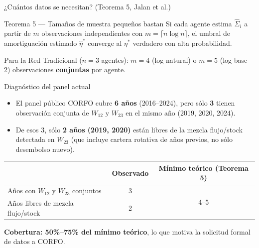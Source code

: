 \documentclass[aspectratio=169]{beamer}
\begin{document}
\begin{frame}{¿Cuántos datos se necesitan? (Teorema 5, Jalan et al.)}
\begin{block}{Teorema 5 --- Tamaños de muestra pequeños bastan}
Si cada agente estima $\hat\Sigma_i$ a partir de $m$ observaciones independientes con $m=\lceil n\log n\rceil$, el umbral de amortiguación estimado $\hat\eta^*$ converge al $\eta^*$ verdadero con alta probabilidad.
\end{block}

\vspace{0.3cm}
Para la Red Tradicional ($n=3$ agentes): $m=4$ (log natural) o $m=5$ (log base 2) observaciones \textbf{conjuntas} por agente.

\vspace{0.2cm}

\end{frame}

\begin{frame}{Diagnóstico del panel actual}
\begin{itemize}
    \item El panel público CORFO cubre \textbf{6 años} (2016--2024), pero sólo \textbf{3} tienen observación conjunta de $W_{12}$ y $W_{23}$ en el mismo año (2019, 2020, 2024).
    \item De esos 3, sólo \textbf{2 años (2019, 2020)} están libres de la mezcla flujo/stock detectada en $W_{23}$ (que incluye cartera rotativa de años previos, no sólo desembolso nuevo).
\end{itemize}

\vspace{0.4cm}
\begin{table}
\centering
\begin{tabular}{lcc}
\toprule
& \textbf{Observado} & \textbf{Mínimo teórico (Teorema 5)} \\
\midrule
Años con $W_{12}$ y $W_{23}$ conjuntos & 3 & \multirow{2}{*}{4--5} \\
Años libres de mezcla flujo/stock & 2 & \\
\bottomrule
\end{tabular}
\end{table}
\centering
\textcolor{OrangeAccent}{\textbf{Cobertura: 50\%--75\% del mínimo teórico}}, lo que motiva la solicitud formal de datos a CORFO.
\end{frame}
\end{document}
